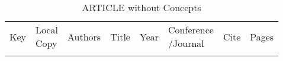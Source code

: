 {\scriptsize
\begin{longtable}{llp{5cm}p{10cm}rp{3cm}lr}
\rowcolor{white}\caption{ARTICLE without Concepts}\\ \toprule
\rowcolor{white}Key & \shortstack{Local\\Copy} & Authors & Title & Year & \shortstack{Conference\\/Journal} & Cite & Pages\\ \midrule
\endhead
\bottomrule
\endfoot
\end{longtable}
}

